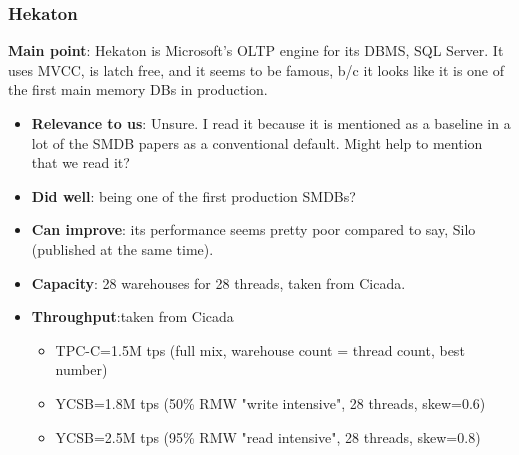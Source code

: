 \subsubsection{Hekaton}
\textbf{Main point}: Hekaton\cite{hekaton} is Microsoft's OLTP engine for its DBMS, SQL Server. It uses MVCC, is latch free, and it seems to be famous, b/c it looks like it is one of the first main memory DBs in production.
\begin{itemize}
    \item \textbf{Relevance to us}: Unsure. I read it because it is mentioned as a baseline in a lot of the SMDB papers as a conventional default. Might help to mention that we read it?
    \item \textbf{Did well}: being one of the first production SMDBs?
    \item \textbf{Can improve}: its performance seems pretty poor compared to say, Silo (published at the same time).
    \item\textbf{Capacity}: 28 warehouses for 28 threads, taken from Cicada.
    \item \textbf{Throughput}:taken from Cicada
    \begin{itemize}
        \item TPC-C=1.5M tps (full mix, warehouse count = thread count, best number)
        \item YCSB=1.8M tps (50\% RMW "write intensive", 28 threads, skew=0.6)
        \item YCSB=2.5M tps (95\% RMW "read intensive", 28 threads, skew=0.8)
    \end{itemize}
\end{itemize}

